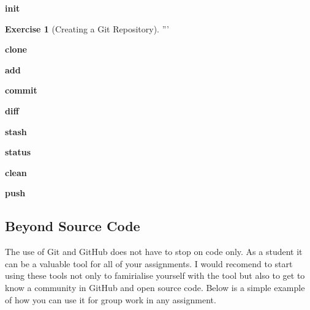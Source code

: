 \documentclass[
]{book}
\theoremstyle{definition}
\theoremstyle{definition}
\theoremstyle{definition}
\newtheorem{exercise}{Exercise}[chapter]
\theoremstyle{remark}
\begin{document}
\textbf{init}
\begin{exercise}[Creating a Git Repository]
\protect\hypertarget{exr:unnamed-chunk-9}{}{\label{exr:unnamed-chunk-9} {} }
'''

\textbf{clone}

\textbf{add}

\textbf{commit}

\textbf{diff}

\textbf{stash}

\textbf{status}

\textbf{clean}

\textbf{push}

\hypertarget{beyond-source-code}{%
\subsection*{Beyond Source Code}\label{beyond-source-code}}

The use of Git and GitHub does not have to stop on code only. As a student it can be a valuable tool for all of your assignments. I would recomend to start using these tools not only to famirialise yourself with the tool but also to get to know a community in GitHub and open source code.
Below is a simple example of how you can use it for group work in any assignment.
\end{exercise}
\end{document}
